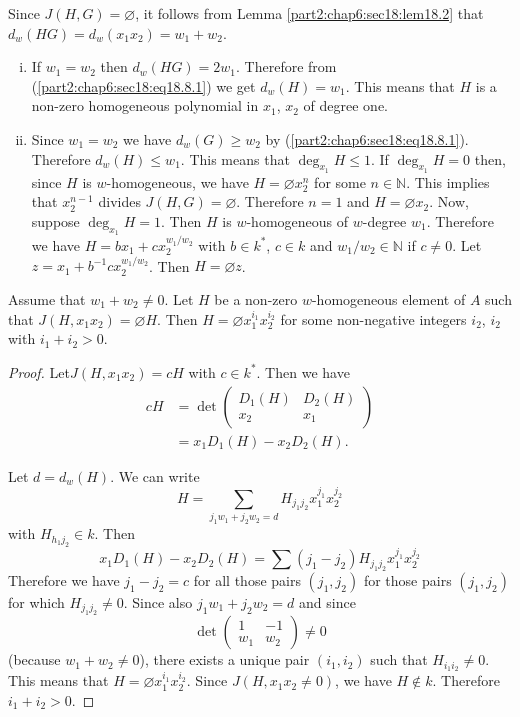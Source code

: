 Since $J(H, G)= \diameter$, it follows from
Lemma \ref{part2:chap6:sec18:lem18.2} that $d_w (HG)= d_w (x_1 x_2)=
w_1 + w_2$.
\begin{enumerate}[(i)]
\item If $w_1= w_2$ then $d_w (HG)= 2w_1$. Therefore from
  (\ref{part2:chap6:sec18:eq18.8.1}) we get $d_w (H)=w_1$. This means
  that $H$ is a non-zero homogeneous polynomial in $x_1$, $x_2$ of
  degree one.

\item Since $w_1= w_2$ we have $d_w (G)\geq w_2$ by
  (\ref{part2:chap6:sec18:eq18.8.1}). Therefore $d_w (H) \leq
  w_1$. This means that $\deg_{x_1} H \leq 1$. If $\deg_{x_1} H=0$
  then, since $H$ is $w$-homogeneous, we have $H= \diameter x_2^n$ for
  some $n \in \mathbb{N}$. This implies that $x_2^{n-1}$ divides $J(H,
  G)= \diameter$. Therefore $n=1$ and $H= \diameter x_2$. Now, suppose
  $\deg_{x_1} H=1$. Then $H$ is $w$-homogeneous of $w$-degree
  $w_1$. Therefore we have $H= bx_1 + cx_2^{w_1/w_2}$ with $b \in
  k^*$, $c \in k$ and $w_1/w_2 \in \mathbb{N}$ if $c \neq 0$. Let $z=
  x_1 + b^{-1} cx_2^{w_1/w_2}$. Then $H= \diameter z$.  
\end{enumerate}

\begin{lemma}\label{part2:chap6:sec18:lem18.9}
  Assume that $w_1 + w_2 \neq 0$. Let $H$ be a non-zero
  $w$-homogeneous element of $A$ such that $J(H, x_1 x_2)= \diameter
  H$. Then $H= \diameter x_1^{i_1} x_2^{i_2}$ for some non-negative
  integers $i_2$, $i_2$ with $i_1 + i_2> 0$.
\end{lemma}

\begin{proof}
  Let\pageoriginale $J(H, x_1 x_2)= cH$ with $c \in k^*$. Then we have
\begin{align*}
  cH & = \det 
  \begin{pmatrix}
    D_1 (H) & D_2 (H)\\
    x_2 & x_1
  \end{pmatrix}\\
  & = x_1 D_1 (H) - x_2 D_2 (H).
\end{align*}

Let $d= d_w (H)$. We can write
$$
H = \sum_{j_1 w_1 + j_2 w_2 =d} H_{j_1 j_2} x_1^{j_1} x_2^{j_2}
$$
with $H_{h_1j_2} \in k$. Then
$$
x_1 D_1 (H) - x_2 D_2 (H) = \sum (j_1- j_2) H_{j_1 j_2} x_1^{j_1} x_2^{j_2}
$$
Therefore we have $j_1- j_2=c$ for all those pairs $(j_1, j_2)$ for
those pairs $(j_1, j_2)$ for which $H_{j_1 j_2} \neq 0$. Since also
$j_1 w_1 + j_2 w_2=d$ and since 
$$
\det 
\begin{pmatrix}
  1 & -1\\
  w_1 & w_2
\end{pmatrix}\neq 0
$$
(because $w_1 + w_2 \neq 0$), there exists a unique pair $(i_1, i_2)$
such that $H_{i_1 i_2}\neq 0$. This means that $H= \diameter x_1^{i_1}
x_2 ^{i_2}$. Since $J(H, x_1 x_2 \neq 0)$, we have $H \notin
k$. Therefore $i_1 + i_2 > 0$. 
\end{proof}

